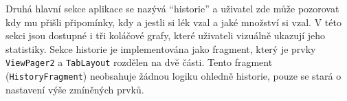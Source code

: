 \documentclass[../TakeYourPill.tex]{subfiles}
\begin{document}
Druhá hlavní sekce aplikace se nazývá \enquote{historie} a uživatel zde může pozorovat kdy mu přišli připomínky, kdy a jestli si lék vzal a jaké množství si vzal. V této sekci jsou dostupné i tři koláčové grafy, které uživateli vizuálně ukazují jeho statistiky. Sekce historie je implementována jako fragment, který je prvky \texttt{ViewPager2} a \texttt{TabLayout} rozdělen na dvě části. Tento fragment (\texttt{HistoryFragment}) neobsahuje žádnou logiku ohledně historie, pouze se stará o nastavení výše zmíněných prvků.

\end{document}
